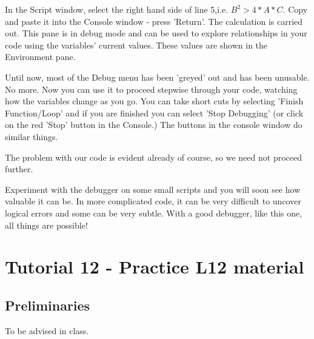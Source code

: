 \documentclass[titlepage]{book}\usepackage{knitr}
\begin{document}
In the Script window, select the right hand side of line 5,i.e. $B^2 > 4*A*C$. Copy and paste it into the Console window - press 'Return'.  The calculation is carried out. This pane is in debug mode and can be used to explore relationships in your code using the variables' current values. These values are shown in the Environment pane. 

Until now, most of the Debug menu has been 'greyed' out and has been unusable. No more.  Now you can use it to proceed stepwise through your code, watching how the variables change as you go. You can take short cuts by selecting 'Finish Function/Loop' and if you are finished you can select 'Stop Debugging' (or click on the red 'Stop' button in the Console.) The buttons in the console window do similar things.

The problem with our code is evident already of course, so we need not proceed further.

Experiment with the debugger on some small scripts and you will soon see how valuable it can be. In more complicated code, it can be very difficult to uncover logical errors and some can be very subtle. With a good debugger, like this one, all things are possible!













\chapter{Tutorial 12 - Practice L12 material }

\author{Brian Williams $<$\href{mailto:bjw649@gmail.com}%
{bjw649@gmail.com}$>$}


\section{Preliminaries}



To be advised in class.







\end{document}
